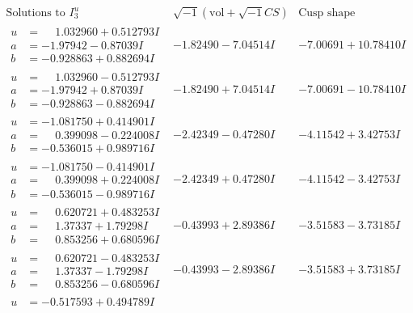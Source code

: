 \documentclass[1p]{elsarticle_modified}
\theoremstyle{definition}
\newcommand{\I}{\sqrt{-1}}
\begin{document}
$$\begin{array}{c|c|c}  
\text{Solutions to }I^u_{3}& \I (\text{vol} + \sqrt{-1}CS) & \text{Cusp shape}\\
 \hline 
\begin{aligned}
u &= \phantom{-}1.032960 + 0.512793 I \\
a &= -1.97942 - 0.87039 I \\
b &= -0.928863 + 0.882694 I\end{aligned}
 & -1.82490 - 7.04514 I & -7.00691 + 10.78410 I \\ \hline\begin{aligned}
u &= \phantom{-}1.032960 - 0.512793 I \\
a &= -1.97942 + 0.87039 I \\
b &= -0.928863 - 0.882694 I\end{aligned}
 & -1.82490 + 7.04514 I & -7.00691 - 10.78410 I \\ \hline\begin{aligned}
u &= -1.081750 + 0.414901 I \\
a &= \phantom{-}0.399098 - 0.224008 I \\
b &= -0.536015 + 0.989716 I\end{aligned}
 & -2.42349 - 0.47280 I & -4.11542 + 3.42753 I \\ \hline\begin{aligned}
u &= -1.081750 - 0.414901 I \\
a &= \phantom{-}0.399098 + 0.224008 I \\
b &= -0.536015 - 0.989716 I\end{aligned}
 & -2.42349 + 0.47280 I & -4.11542 - 3.42753 I \\ \hline\begin{aligned}
u &= \phantom{-}0.620721 + 0.483253 I \\
a &= \phantom{-}1.37337 + 1.79298 I \\
b &= \phantom{-}0.853256 + 0.680596 I\end{aligned}
 & -0.43993 + 2.89386 I & -3.51583 - 3.73185 I \\ \hline\begin{aligned}
u &= \phantom{-}0.620721 - 0.483253 I \\
a &= \phantom{-}1.37337 - 1.79298 I \\
b &= \phantom{-}0.853256 - 0.680596 I\end{aligned}
 & -0.43993 - 2.89386 I & -3.51583 + 3.73185 I \\ \hline\begin{aligned}
u &= -0.517593 + 0.494789 I \\

\end{aligned}
\end{array}$$
\end{document}
